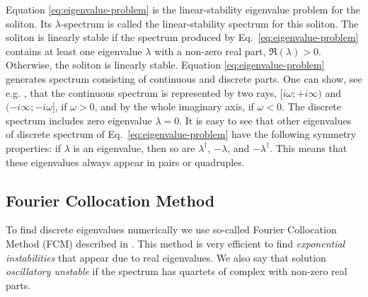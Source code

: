 Equation \eqref{eq:eigenvalue-problem} is the linear-stability eigenvalue problem for the soliton.
Its $\lambda$-spectrum is called the linear-stability spectrum for this soliton.
The soliton is linearly stable if the spectrum produced by Eq.~\eqref{eq:eigenvalue-problem} contains at least one eigenvalue $\lambda$ with a non-zero real part, $\mathfrak{R}(\lambda) > 0$.
Otherwise, the soliton is linearly stable.
Equation \eqref{eq:eigenvalue-problem} generates spectrum consisting of continuous and discrete parts.
One can show, see e.g. \cite{JiankeYang}, that the continuous spectrum is represented by two rays, $[i\omega; +i \infty)$ and $(-i \infty; -i \omega]$, if $\omega > 0$, and by the whole imaginary axis, if $\omega < 0$.
The discrete spectrum includes zero eigenvalue $\lambda = 0$.
It is easy to see that other eigenvalues of discrete spectrum of Eq.~\eqref{eq:eigenvalue-problem} have the following symmetry properties: if $\lambda$ is an eigenvalue, then so are $\lambda^{\dagger}$, $-\lambda$, and $-\lambda^{\dagger}$.
This means that these eigenvalues always appear in pairs or quadruples.

\subsection{Fourier Collocation Method}

To find discrete eigenvalues numerically we use so-called Fourier Collocation Method (FCM) described in \cite{JiankeYang}.
This method is very efficient to find {\it exponential instabilities} that appear due to real eigenvalues.
We also say that solution {\it oscillatory unstable} if the spectrum has quartets of complex with non-zero real parts.

